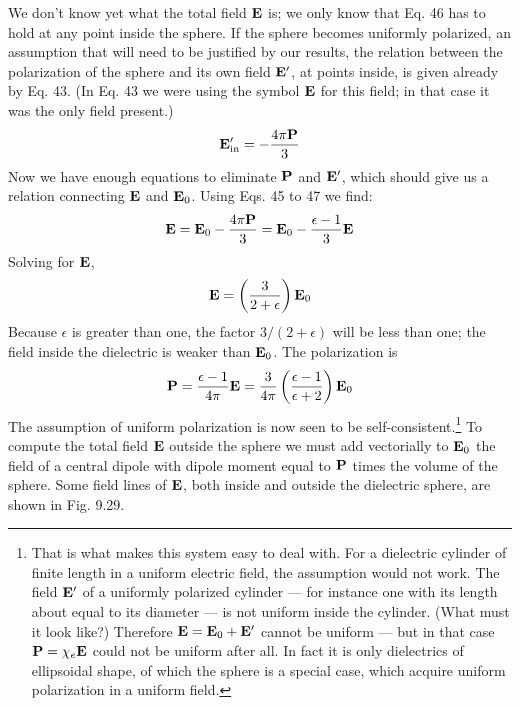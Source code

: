 We don't know yet what the total field $\mathbf{E}$ is; we only know that
Eq. 46 has to hold at any point inside the sphere. If the sphere becomes
uniformly polarized, an assumption that will need to be
justified by our results, the relation between the polarization of the
sphere and its own field $\mathbf{E}'$, at points inside, is given already by Eq. 43.
(In Eq. 43 we were using the symbol $\mathbf{E}$ for this field; in that case it
was the only field present.)
\begin{equation}
  \mathbf{E}'_\text{in} = -\frac{4\pi \mathbf{P}}{3} 
\end{equation}
Now we have enough equations to eliminate $\mathbf{P}$ and $\mathbf{E}'$, which should
give us a relation connecting $\mathbf{E}$ and $\mathbf{E}_0$. Using Eqs. 45 to 47 we find:
\begin{equation}
  \mathbf{E} = \mathbf{E}_0-\frac{4\pi \mathbf{P}}{3} = \mathbf{E}_0-\frac{\epsilon-1}{3}\mathbf{E}
\end{equation}
Solving for $\mathbf{E}$,
\begin{equation}
  \mathbf{E} = \left(\frac{3}{2+\epsilon}\right)\mathbf{E}_0
\end{equation}
Because $\epsilon$ is greater than one, the factor $3/ (2 + \epsilon)$ will be less than
one; the field inside the dielectric is weaker than $\mathbf{E}_0$. The polarization
is
\begin{equation}
  \mathbf{P} = \frac{\epsilon-1}{4\pi} \mathbf{E} = \frac{3}{4\pi}\left(\frac{\epsilon-1}{\epsilon+2}\right)\mathbf{E}_0
\end{equation}
The assumption of uniform polarization is now seen to be 
self-consistent.\footnote{That is what makes this system easy to deal 
with. For a dielectric cylinder of
finite length in a uniform electric field, the assumption would not work. The field $\mathbf{E}'$
of a uniformly polarized cylinder --- for instance one with its length about equal to its
diameter --- is not uniform inside the cylinder. (What must it look like?) Therefore
$\mathbf{E} = \mathbf{E}_0 + \mathbf{E}'$ cannot be uniform --- but in that case 
$\mathbf{P}=\chi_e\mathbf{E}$ could not be uniform after
all. In fact it is only dielectrics of ellipsoidal shape, of which the sphere is a special
case, which acquire uniform polarization in a uniform field.}
To compute the total field $\mathbf{E}$ outside the sphere we must
add vectorially to $\mathbf{E}_0$ the field of a central dipole with dipole moment
equal to $\mathbf{P}$ times the volume of the sphere. Some field lines of $\mathbf{E}$,
both inside and outside the dielectric sphere, are shown in Fig. 9.29.

